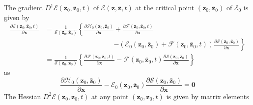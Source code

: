 \documentclass[aps,preprint]{revtex4}%
\begin{document}
The gradient $D^{1}\mathcal{E}\left(  \mathbf{z}_{0},\mathbf{\bar{z}}%
_{0},t\right)  $ of $\mathcal{E}\left(  \mathbf{z},\mathbf{\bar{z}},t\right)
$ at the critical point $\left(  \mathbf{z}_{0},\mathbf{\bar{z}}_{0}\right)  $
of $\mathcal{E}_{0}$ is given by
\begin{align*}
\frac{\partial\mathcal{E}\left(  \mathbf{z}_{0},\mathbf{\bar{z}}_{0},t\right)
}{\partial\mathbf{x}} &  =\frac{1}{\mathcal{S}\left(  \mathbf{z}%
_{0},\mathbf{\bar{z}}_{0}\right)  }\left\{  \frac{\partial\mathcal{H}%
_{0}\left(  \mathbf{z}_{0},\mathbf{\bar{z}}_{0}\right)  }{\partial\mathbf{x}%
}+\frac{\partial\mathcal{F}\left(  \mathbf{z}_{0},\mathbf{\bar{z}}%
_{0},t\right)  }{\partial\mathbf{x}}\right.  \\
&  \qquad\qquad\qquad\qquad\qquad\left.  -\left(  \mathcal{E}_{0}\left(
\mathbf{z}_{0},\mathbf{\bar{z}}_{0}\right)  +\mathcal{F}\left(  \mathbf{z}%
_{0},\mathbf{\bar{z}}_{0},t\right)  \right)  \frac{\partial\mathcal{S}\left(
\mathbf{z}_{0},\mathbf{\bar{z}}_{0}\right)  }{\partial\mathbf{x}}\right\}  \\
&  =\frac{1}{\mathcal{S}\left(  \mathbf{z}_{0},\mathbf{\bar{z}}_{0}\right)
}\left\{  \frac{\partial\mathcal{F}\left(  \mathbf{z}_{0},\mathbf{\bar{z}}%
_{0},t\right)  }{\partial\mathbf{x}}-\mathcal{F}\left(  \mathbf{z}%
_{0},\mathbf{\bar{z}}_{0},t\right)  \frac{\partial\mathcal{S}\left(
\mathbf{z}_{0},\mathbf{\bar{z}}_{0}\right)  }{\partial\mathbf{x}}\right\}
\end{align*}
as
\begin{equation}
\frac{\partial\mathcal{H}_{0}\left(  \mathbf{z}_{0},\mathbf{\bar{z}}%
_{0}\right)  }{\partial\mathbf{x}}-\mathcal{E}_{0}\left(  \mathbf{z}%
_{0},\mathbf{\bar{z}}_{0}\right)  \frac{\partial\mathcal{S}\left(
\mathbf{z}_{0},\mathbf{\bar{z}}_{0}\right)  }{\partial\mathbf{x}}=\mathbf{0}%
\end{equation}
The Hessian $D^{2}\mathcal{E}\left(  \mathbf{z}_{0},\mathbf{\bar{z}}%
_{0},t\right)  $ at any point $\left(  \mathbf{z}_{0},\mathbf{\bar{z}}%
_{0},t\right)  $ is given by matrix elements
\end{document}
